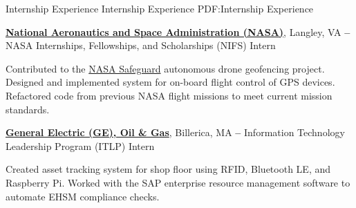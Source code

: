\Section
{Internship Experience}
{Internship Experience}
{PDF:Internship Experience}

\Entry
\href{https://www.nasa.gov/}
{\textbf{National Aeronautics and Space Administration (NASA)}},
Langley, VA
\dotfill
\textbf{ -- }
\SubEntry
\Gap
NASA Internships, Fellowships, and Scholarships (NIFS) Intern
\begin{Detail}
    \SubBulletItem
    Contributed to the \href{https://www.nasa.gov/langley/business/feature/nasa-langley-s-safeguard-system-for-uavs-aims-to-take-flight}{NASA Safeguard} autonomous drone geofencing project.
    \SubBulletItem
    Designed and implemented system for on-board flight control of GPS devices.
    \SubBulletItem
    Refactored code from previous NASA flight missions to meet current mission standards.
\end{Detail}

\BigGap
\Entry
\href{https://www.ge.com/}
{\textbf{General Electric (GE), Oil \& Gas}},
Billerica, MA
\dotfill
\textbf{ --
}
\SubEntry
\Gap
Information Technology Leadership Program (ITLP) Intern
\begin{Detail}
    \SubBulletItem
    Created asset tracking system for shop floor using RFID, Bluetooth LE, and Raspberry Pi.
    \SubBulletItem
    Worked with the SAP enterprise resource management software to automate EHSM compliance checks.
\end{Detail}
